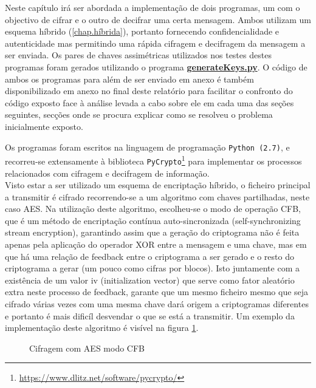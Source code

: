 \documentclass[a4paper,11pt,openright,oneside]{report}
\begin{document}
Neste capítulo irá ser abordada a implementação de dois programas, um com o objectivo de cifrar e o outro de decifrar uma certa mensagem. Ambos utilizam um esquema híbrido (\ref{chap.híbrida}), portanto fornecendo confidencialidade e autenticidade mas permitindo uma rápida cifragem e decifragem da mensagem a ser enviada. Os pares de chaves assimétricas utilizados nos testes destes programas foram gerados utilizando o programa \href{run:../Python/KeysGenerator/generateKeys.py}{\textbf{generateKeys.py}}. O código de ambos os programas para além de ser enviado em anexo é também disponibilizado em anexo no final deste relatório para facilitar o confronto do código exposto face à análise levada a cabo sobre ele em cada uma das seções seguintes, secções onde se procura explicar como se resolveu o problema inicialmente exposto.

Os programas foram escritos na linguagem de programação \verb|Python (2.7)|, e recorreu-se extensamente à biblioteca \verb|PyCrypto|\footnote{\url{https://www.dlitz.net/software/pycrypto/}} para implementar os processos relacionados com cifragem e decifragem de informação.\\


Visto estar a ser utilizado um esquema de encriptação híbrido, o ficheiro principal a transmitir é cifrado recorrendo-se a um algoritmo com chaves partilhadas, neste caso AES. Na utilização deste algoritmo, escolheu-se o modo de operação CFB, que é um método de encriptação contínua auto-sincronizada (self-synchronizing stream encryption), garantindo assim que a geração do criptograma não é feita apenas pela aplicação do operador XOR entre a mensagem e uma chave, mas em que há uma relação de feedback entre o criptograma a ser gerado e o resto do criptograma a gerar (um pouco como cifras por blocos). Isto juntamente com a existência de um valor iv (initialization vector) que serve como fator aleatório extra neste processo de feedback, garante que um mesmo ficheiro mesmo que seja cifrado várias vezes com uma mesma chave dará origem a criptogramas diferentes e portanto é mais dificíl desvendar o que se está a transmitir. Um exemplo da implementação deste algoritmo é visível na figura \ref{fig:crypto6}.

\begin{figure}[ht]
\center
{}
\caption{Cifragem com AES modo CFB}
\label{fig:crypto6}
\end{figure}
\end{document}
